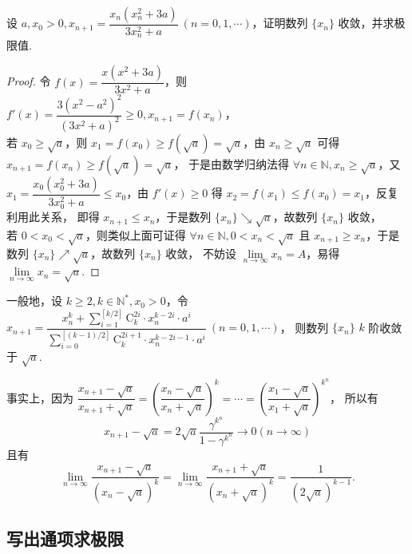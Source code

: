 \begin{example}
    设 $a,x_0>0,x_{n+1}=\dfrac{x_n\left(x_n^2+3a\right)}{3x_n^2+a}~  (n=0,1,\cdots)$，证明数列 $\{x_n\}$ 收敛，并求极限值.
\end{example}
\begin{proof}
    令 $f(x)=\dfrac{x(x^2+3a)}{3x^2+a}$，则 $f'(x) =\dfrac{3\left( x^{2}-a^{2}\right) ^{2}}{\left( 3x^{2}+a\right) ^{2}}\geqslant 0,x_{n+1}=f(x_n)$，\\
    若 $x_0\geqslant \sqrt{a}$，则 $x_1=f(x_0)\geqslant f\left(\sqrt a\right)=\sqrt{a}$，由 $x_n\geqslant \sqrt{a}$ 可得 $x_{n+1}=f(x_n)\geqslant f\left(\sqrt{a}\right)=\sqrt{a}$，
    于是由数学归纳法得 $\forall n\in\mathbb{N},x_n\geqslant\sqrt{a}$，又 $x_1=\dfrac{x_0\left(x_0^2+3a\right)}{3x_0^2+a}\leqslant x_0$，由 $f'(x)\geqslant 0$ 得 $x_2=f(x_1)\leqslant f(x_0)=x_1$，反复利用此关系，
    即得 $x_{n+1}\leqslant x_n$，于是数列 $\{x_n\}\searrow\sqrt{a}$，故数列 $\{x_n\}$ 收敛，\\
    若 $0<x_0<\sqrt{a}$，则类似上面可证得 $\forall n\in\mathbb{N},0<x_n<\sqrt{a}$ 且 $x_{n+1}\geqslant x_{n}$，于是数列 $\{x_n\}\nearrow\sqrt{a}$，故数列 $\{x_n\}$ 收敛，
    不妨设 $\lim\limits_{n\to\infty}x_n=A$，易得 $\lim\limits_{n\to\infty}x_n=\sqrt{a}.$
\end{proof}
\begin{inference}
    一般地，设 $k\geqslant 2,k\in\mathbb{N}^*,x_0>0$，令 $x_{n+1}=\dfrac{\displaystyle x_{n}^{k}+\sum\limits ^{\left[ k/2\right] }_{i=1}\mathrm{C}_{k}^{2i}\cdot x_{n}^{k-2i}\cdot a^{i}}{\displaystyle\sum\limits ^{\left[ \left( k-1\right) /2\right] }_{i=0}\mathrm{C}_{k}^{2i+1}\cdot x_{n}^{k-2i-1}\cdot a^{i}}~  (n=0,1,\cdots)$，
    则数列 $\{x_n\}$ $k$ 阶收敛于 $\sqrt{a}.$

    事实上，因为 $\dfrac{x_{n+1}-\sqrt{a}}{x_{n+1}+\sqrt{a}}=\left( \dfrac{x_{n}-\sqrt{a}}{x_{n}+\sqrt{a}}\right) ^{k}=\cdots =\left( \dfrac{x_{1}-\sqrt{a}}{x_{1}+\sqrt{a}}\right) ^{k^{n}}$，
    所以有 $$x_{n+1}-\sqrt{a}=2\sqrt{a}\dfrac{\gamma ^{k^{n}}}{1-\gamma ^{k^{n}}}\rightarrow 0\left( n\rightarrow \infty \right) $$
    且有
    $$\lim _{n\rightarrow \infty }\dfrac{x_{n+1}-\sqrt{a}}{\left( x_{n}-\sqrt{a}\right) ^{k}}=\lim _{n\rightarrow \infty }\dfrac{x_{n+1}+\sqrt{a}}{\left( x_{n}+\sqrt{a}\right) ^{k}}=\dfrac{1}{\left( 2\sqrt{a}\right) ^{k-1}}.$$
\end{inference}

\subsection{写出通项求极限}

